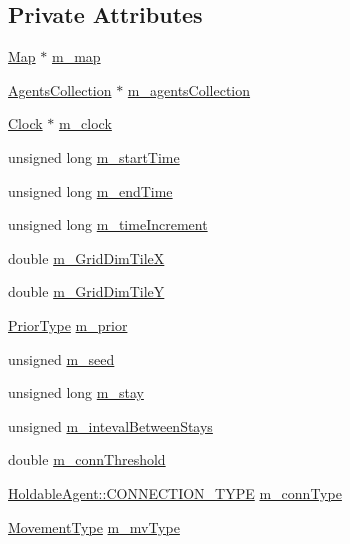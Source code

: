 \subsection*{Private Attributes}
\begin{DoxyCompactItemize}
\item 
\hyperlink{class_map}{Map} $\ast$ \hyperlink{class_world_ae1e6f62c5b282e94ffdcaab58fcb3fb4}{m\+\_\+map}
\item 
\hyperlink{class_agents_collection}{Agents\+Collection} $\ast$ \hyperlink{class_world_ae1262689381f00828c0a639b7cbb52a3}{m\+\_\+agents\+Collection}
\item 
\hyperlink{class_clock}{Clock} $\ast$ \hyperlink{class_world_a8359eb424f01e41703faa0885a4414bf}{m\+\_\+clock}
\item 
unsigned long \hyperlink{class_world_a5b46814e7da7222730be62154bf10008}{m\+\_\+start\+Time}
\item 
unsigned long \hyperlink{class_world_ab6b8ad11e4031f3072a78f00a66e9ec5}{m\+\_\+end\+Time}
\item 
unsigned long \hyperlink{class_world_a97f773548fef49eb408115c097aa995d}{m\+\_\+time\+Increment}
\item 
double \hyperlink{class_world_afe0caad7af3f4b69c46381fd1c5f5fab}{m\+\_\+\+Grid\+Dim\+TileX}
\item 
double \hyperlink{class_world_a0c992a133f3fcc0467564135be1bbfc8}{m\+\_\+\+Grid\+Dim\+TileY}
\item 
\hyperlink{_prior_type_8h_a61286c562e68de246982fc393a7c23a5}{Prior\+Type} \hyperlink{class_world_af7fca82468f73094ec5ba75577b0d96a}{m\+\_\+prior}
\item 
unsigned \hyperlink{class_world_aa74ce0cd7a9f18e431c09dc1833ff898}{m\+\_\+seed}
\item 
unsigned long \hyperlink{class_world_aec7eeecfae85a75b04b382f16baf7aa0}{m\+\_\+stay}
\item 
unsigned \hyperlink{class_world_a44ccd94fe9ee367f2f00c59eb0ad272c}{m\+\_\+inteval\+Between\+Stays}
\item 
double \hyperlink{class_world_aa70fecad5b4c843379920c0011c64648}{m\+\_\+conn\+Threshold}
\item 
\hyperlink{class_holdable_agent_ae2c334b004d7b9c5a999cf2618e4e518}{Holdable\+Agent\+::\+C\+O\+N\+N\+E\+C\+T\+I\+O\+N\+\_\+\+T\+Y\+PE} \hyperlink{class_world_afeac65cddcd1e1c4fa14a17efa35be06}{m\+\_\+conn\+Type}
\item 
\hyperlink{_movement_type_8h_a8a93b61bc797a7d1907f42796a252493}{Movement\+Type} \hyperlink{class_world_a9fcf012ce7262edf5646f0720ffd7666}{m\+\_\+mv\+Type}

\end{DoxyCompactItemize}
